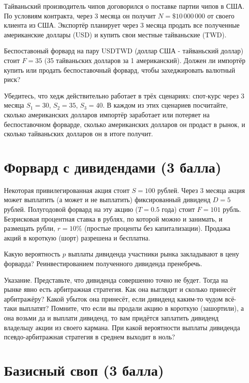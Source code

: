 \documentclass[a4paper,14pt]{extarticle}
\begin{document}
Тайваньский производитель чипов договорился о поставке партии чипов в США. По условиям 
контракта, через 3 месяца он получит $N=\$10\,000\,000$ от своего клиента из США. Экспортёр планирует через 3 месяца продать все полученные американские доллары (USD) и купить свои местные тайваньские (TWD). 

Беспоставоный форвард на пару USDTWD (доллар США - тайваньский доллар) стоит $F=35$ (35 тайваньских долларов за 1 американский). Должен ли импортёр купить или продать беспоставочный форвард, чтобы захеджировать 
валютный риск?

Убедитесь, что хедж действительно работает в трёх сценариях: спот-курс 
через 3 месяца $S_1=30$, $S_2=35$, $S_3=40$. В каждом из этих сценариев посчитайте, 
сколько американских долларов импортёр заработает или потеряет на беспоставочном форварде, сколько американских долларов он продаст в рынок, и сколько тайваньских долларов он в итоге получит.

\section{Форвард с дивидендами (3 балла)}

Некоторая привилегированная акция стоит $S=100$ рублей. Через 3 месяца акция может выплатить (а может и не выплатить) фиксированный дивиденд $D=5$ рублей. Полугодовой форвард на эту акцию ($T=0.5$ года) стоит $F=101$ рубль. Безрисковая процентная ставка в рублях, по которой можно и занимать, и размещать рубли, $r=10\%$ (простые проценты без капитализации). Продажа акций в короткую (шорт) разрешена и бесплатна.

Какую вероятность $p$ выплаты дивиденда участники рынка закладывают в цену форварда? Реинвестированием полученного дивиденда пренебречь.

Указание. Представьте, что дивиденда совершенно точно не будет. Тогда на рынке явно есть арбитражная стратегия. Как она выглядит и сколько принесёт арбитражёру? Какой убыток она принесёт, если дивиденд каким-то чудом всё-таки выплатят? Помните, что если вы продали акцию в короткую (зашортили), а она возьми да и выплати дивиденд, то вам придётся заплатить дивиденд владельцу акции из своего кармана. При какой вероятности выплаты дивиденда псевдо-арбитражная стратегия в среднем выходит в ноль?

\section{Базисный своп (3 балла)}
\end{document}
